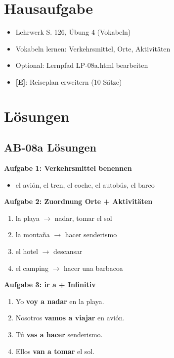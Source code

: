 \documentclass[11pt,a4paper]{article}
\newcommand{\E}{\textcolor{erweiterung}{\textbf{[E]}}}
\begin{document}
\section{Hausaufgabe}

\begin{itemize}
    \item Lehrwerk S. 126, Übung 4 (Vokabeln)
    \item Vokabeln lernen: Verkehrsmittel, Orte, Aktivitäten
    \item Optional: Lernpfad LP-08a.html bearbeiten
    \item \E{}: Reiseplan erweitern (10 Sätze)
\end{itemize}

\section{Lösungen}

\subsection{AB-08a Lösungen}

\textbf{Aufgabe 1: Verkehrsmittel benennen}
\begin{itemize}
    \item el avión, el tren, el coche, el autobús, el barco
\end{itemize}

\textbf{Aufgabe 2: Zuordnung Orte + Aktivitäten}
\begin{enumerate}[label=\alph*)]
    \item la playa $\rightarrow$ nadar, tomar el sol
    \item la montaña $\rightarrow$ hacer senderismo
    \item el hotel $\rightarrow$ descansar
    \item el camping $\rightarrow$ hacer una barbacoa
\end{enumerate}

\textbf{Aufgabe 3: ir a + Infinitiv}
\begin{enumerate}[label=\alph*)]
    \item Yo \textbf{voy a nadar} en la playa.
    \item Nosotros \textbf{vamos a viajar} en avión.
    \item Tú \textbf{vas a hacer} senderismo.
    \item Ellos \textbf{van a tomar} el sol.
\end{enumerate}
\end{document}
